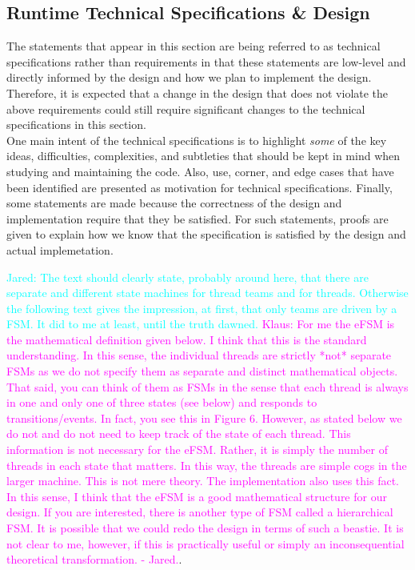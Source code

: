 \documentclass{article}
\newcommand{\Jared}[1]          {\textcolor{cyan}{Jared: #1}}
\newcommand{\KlausRfromJO}[1]   {\textcolor{magenta}{Klaus: #1 - Jared.}}
\begin{document}
\subsection{Runtime Technical Specifications \& Design}
The statements that appear in this section are being referred to as technical
specifications rather than requirements in that these statements are low-level
and directly informed by the design and how we plan to implement the design.
Therefore, it is expected that a change in the design that does not violate the
above requirements could still require significant changes to the technical
specifications in this section.\\

One main intent of the technical specifications is to highlight \textit{some} of
the key ideas, difficulties, complexities, and subtleties that should be kept in
mind when studying and maintaining the code.  Also, use, corner, and edge cases
that have been identified are presented as motivation for technical
specifications.  Finally, some statements are made because the correctness of
the design and implementation require that they be satisfied.  For such
statements, proofs are given to explain how we know that the specification is
satisfied by the design and actual implemetation.

\Jared{The text should clearly state, probably around here, that there are separate
and different state machines for thread teams and for threads. Otherwise the
following text gives the impression, at first, that only teams are driven by a
FSM. It did to me at least, until the truth dawned.}
\KlausRfromJO{For me the eFSM is the mathematical definition given below.  I
think that this is the standard understanding.  In this sense, the individual
threads are strictly *not* separate FSMs as we do not specify them as separate
and distinct mathematical objects.  That said, you can think of them as FSMs in
the sense that each thread is always in one and only one of three states (see
below) and
responds to transitions/events.  In fact, you see this in Figure 6.
However, as stated below we do not and do not need to keep track of the state of
each thread.  This information is not necessary for the eFSM.  Rather, it is
simply the number of threads in each state that matters.  In this way, the
threads are simple cogs in the larger machine.   This is not mere
theory.  The implementation also uses this fact.  In this sense, I think that
the eFSM is a good mathematical structure for our design.  If you are
interested, there is another type of FSM called a hierarchical FSM.  It is
possible that we could redo the design in terms of such a beastie.  It is not
clear to me, however, if this is practically useful or simply an inconsequential theoretical
transformation.}.
\end{document}
